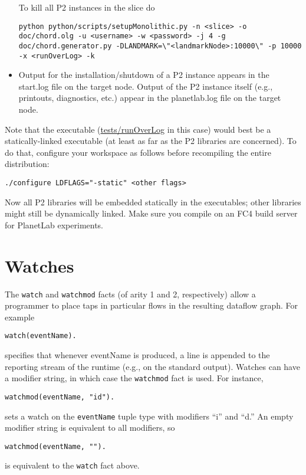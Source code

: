 \documentclass{article}
\begin{document}
\begin{itemize}
To kill all P2 instances in the slice do

\begin{verbatim}
python python/scripts/setupMonolithic.py -n <slice> -o
doc/chord.olg -u <username> -w <password> -j 4 -g
doc/chord.generator.py -DLANDMARK=\"<landmarkNode>:10000\" -p 10000
-x <runOverLog> -k
\end{verbatim}

\item Output for the installation/shutdown of a P2 instance appears in the
start.log file on the target node.  Output of the P2 instance itself
(e.g., printouts, diagnostics, etc.) appear in the planetlab.log file on
the target node.
\end{itemize}

Note that the executable (\url{tests/runOverLog} in this case) would
best be a statically-linked executable (at least as far as the P2
libraries are concerned). To do that, configure your workspace as
follows before recompiling the entire distribution:
\begin{verbatim}
./configure LDFLAGS="-static" <other flags>
\end{verbatim}
Now all P2 libraries will be embedded statically in the executables;
other libraries might still be dynamically linked.  Make sure you
compile on an FC4 build server for PlanetLab experiments.





\section{Watches}
\label{sec:watches}

The \lstinline$watch$ and \lstinline$watchmod$ facts (of arity 1 and 2,
respectively) allow a programmer to place taps in
particular flows in the resulting dataflow graph.  For example 
\begin{lstlisting}
watch(eventName).
\end{lstlisting}
specifies that whenever eventName is produced, a line is appended to the
reporting stream of the runtime (e.g., on the standard output).  Watches
can have a modifier string, in which case the \lstinline$watchmod$ fact
is used.  For instance,
\begin{lstlisting}
watchmod(eventName, "id").
\end{lstlisting}
sets a watch on the \lstinline$eventName$ tuple type with modifiers
``i'' and ``d.''  An empty modifier string is equivalent to all
modifiers, so 
\begin{lstlisting}
watchmod(eventName, "").
\end{lstlisting}
is equivalent to the \lstinline$watch$ fact above.
\end{document}
